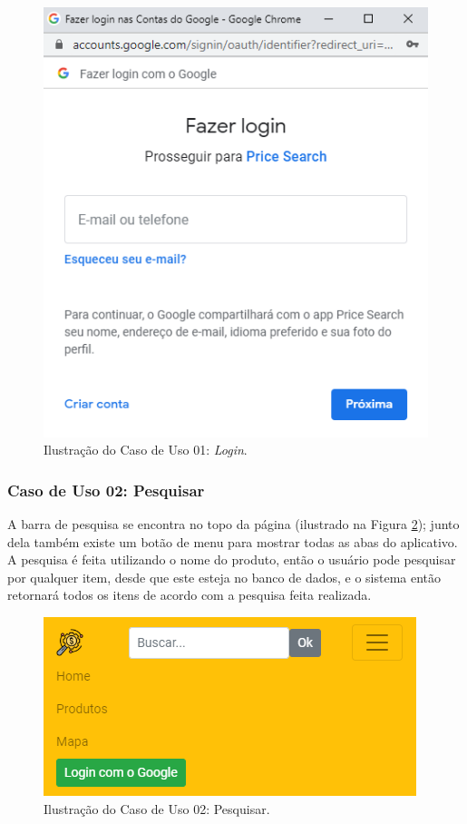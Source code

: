 \begin{figure}[H]
\centering
\includegraphics[width=\linewidth]{figuras/tela-login.png}
\caption{Ilustração do Caso de Uso 01: \textit{Login}.}
\label{fig:login}
\end{figure}

\subsubsection{Caso de Uso 02: Pesquisar}

A barra de pesquisa se encontra no topo da página (ilustrado na Figura \ref{fig:menu}); junto dela também existe um botão de menu para mostrar todas as abas do aplicativo. A pesquisa é feita utilizando o nome do produto, então o usuário pode pesquisar por qualquer item, desde que este esteja no banco de dados, e o sistema então retornará todos os itens de acordo com a pesquisa feita realizada.

\begin{figure}[H]
\centering
\includegraphics[width=\linewidth]{figuras/tela-menu.png}
\caption{Ilustração do Caso de Uso 02: Pesquisar.}
\label{fig:menu}
\end{figure}

